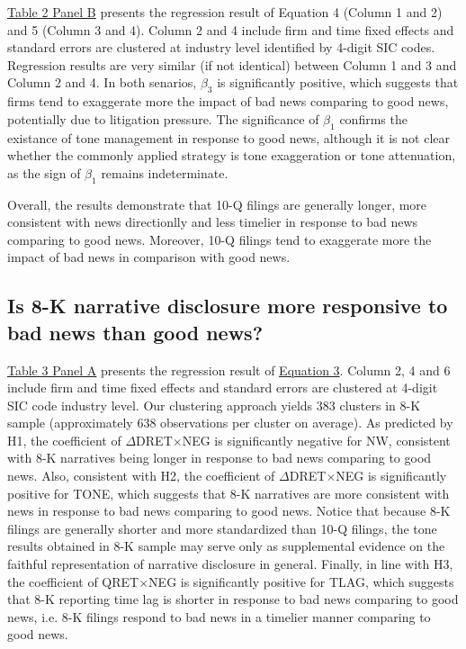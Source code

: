 \documentclass[a4paper]{article}
\begin{document}
\begin{spacing}{2}
\hyperref[T2PB]{Table 2 Panel B} presents the regression result of Equation 4 (Column 1 and 2) and 5 (Column 3 and 4). Column 2 and 4 include firm and time fixed effects and standard errors are clustered at industry level identified by 4-digit SIC codes. Regression results are very similar (if not identical) between Column 1 and 3 and Column 2 and 4. In both senarios, $\beta_3$ is significantly positive, which suggests that firms tend to exaggerate more the impact of bad news comparing to good news, potentially due to litigation pressure. The significance of $\beta_1$ confirms the existance of tone management in response to good news, although it is not clear whether the commonly applied strategy is tone exaggeration or tone attenuation, as the sign of $\beta_1$ remains indeterminate.

Overall, the results demonstrate that 10-Q filings are generally longer, more consistent with news directionlly and less timelier in response to bad news comparing to good news. Moreover, 10-Q filings tend to exaggerate more the impact of bad news in comparison with good news. 

\subsection{Is 8-K narrative disclosure more responsive to bad news than good news?}
\hyperref[T3PA]{Table 3 Panel A} presents the regression result of \hyperref[eq3]{Equation 3}. Column 2, 4 and 6 include firm and time fixed effects and standard errors are clustered at 4-digit SIC code industry level. Our clustering approach yields 383 clusters in 8-K sample (approximately 638 observations per cluster on average). As predicted by H1, the coefficient of $\Delta$DRET$\times$NEG is significantly negative for NW, consistent with 8-K narratives being longer in response to bad news comparing to good news. Also, consistent with H2, the coefficient of $\Delta$DRET$\times$NEG is significantly positive for TONE, which suggests that 8-K narratives are more consistent with news in response to bad news comparing to good news. Notice that because 8-K filings are generally shorter and more standardized than 10-Q filings, the tone results obtained in 8-K sample may serve only as supplemental evidence on the faithful representation of narrative disclosure in general. Finally, in line with H3, the coefficient of QRET$\times$NEG is significantly positive for TLAG, which suggests that 8-K reporting time lag is shorter in response to bad news comparing to good news, i.e. 8-K filings respond to bad news in a timelier manner comparing to good news.


\end{spacing}
\end{document}
